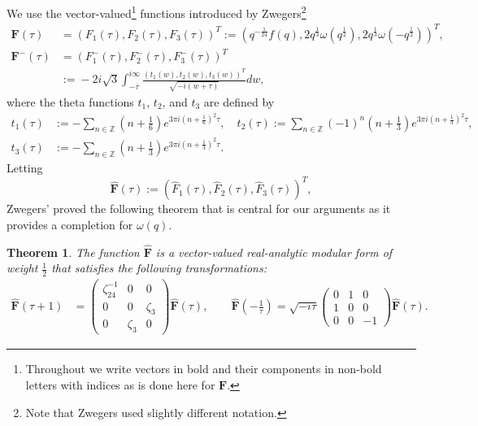 \documentclass[12pt,reqno]{amsart}
\renewcommand{\o}{{\omega}}
\renewcommand{\t}{\tau}
\newcommand{\z}{\zeta}
\renewcommand{\(}{\left\(}
\renewcommand{\)}{\right\)}
\numberwithin{equation}{section}
\theoremstyle{plain}
\newtheorem{theorem}{Theorem}[section]
\theoremstyle{definition}
\numberwithin{equation}{section}
\begin{document}
 We use the vector-valued\footnote{Throughout we write vectors in bold and their components in non-bold letters with indices as is done here for $\bm{F}$.} functions introduced by Zwegers\footnote{Note that Zwegers used slightly different notation.} \cite{Zwegers}
\begin{align}\label{defF}
\bm{F}\left(\t\right)&=\left(F_1(\t),F_2(\t),F_3(\t)\right)^T:=\left(q^{-\frac{1}{24}}f(q),2q^{\frac 13}\o\!\left(q^{\frac 12}\right), 2q^{\frac 13}\o\!\left(-q^{\frac 12}\right)\right)^T,\nonumber\\
\bm{F}^{-}\left(\t\right)\!&=\!\left(F^{-}_1(\t),F^{-}_2(\t), F^{-}_3(\t)\right)^T\!\nonumber\\
&:=\!-2i\sqrt{3}\int^{i\infty}_{-\overline{\t}}\frac{\left(t_1(w),t_2(w),t_3(w)\right)^T}{\sqrt{-i\left(w+\t\right)}}dw,
\end{align}
where the theta functions $t_1$, $t_2$, and $t_3$ are defined by
\begin{align*}%
t_1(\t)&:=-\sum_{n\in \mathbb{Z}}\left(n+\frac 16\right)e^{3\pi i\left(n+\frac 16\right)^2\t},\quad t_2(\t):=\sum_{n\in \mathbb{Z}}(-1)^n \left(n+\frac 13\right)e^{3\pi i\left(n+\frac 13\right)^2\t},\nonumber\\
t_3(\t)&:=-\sum_{n\in \mathbb{Z}}\left(n+\frac 13\right)e^{3\pi i\left(n+\frac 13\right)^2\t}.%
\end{align*}
Letting
\[
\widehat{\bm{F}}(\t):=\left(\widehat{F}_1(\t), \widehat{F}_2(\t), \widehat{F}_3(\t)\right)^T,
\]
Zwegers' proved the following theorem \cite{Zwegers} that is central for our arguments as it provides a completion for $\o(q)$. 
\begin{theorem}\label{Zthm}
	The function $\widehat{\bm{F}}$ is a vector-valued real-analytic modular form of weight $\frac 12$ that satisfies the following transformations:
	\begin{align*}
	\widehat{\bm{F}}(\t+1)&=\begin{pmatrix}
	\z^{-1}_{24}&0 &0\\
	0 &0 & \z_3\\
	0&\z_3&0
	\end{pmatrix}\widehat{\bm{F}}(\t),\qquad \widehat{\bm{F}}\left(-\frac{1}{\t}\right)=\sqrt{-i\t}\begin{pmatrix}
	0&1 &0\\
	1 &0 & 0\\
	0&0&-1
	\end{pmatrix}\widehat{\bm{F}}(\t).
	\end{align*}
\end{theorem}
\end{document}
